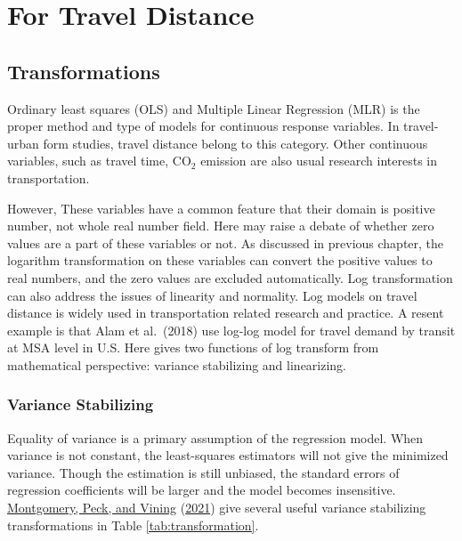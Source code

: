 \documentclass[
  11pt,
  openany]{memoir}
\begin{document}
\hypertarget{for-travel-distance}{%
\section{For Travel Distance}\label{for-travel-distance}}

\hypertarget{transformations}{%
\subsection{Transformations}\label{transformations}}

Ordinary least squares (OLS) and Multiple Linear Regression (MLR) is the proper method and type of models for continuous response variables. In travel-urban form studies, travel distance belong to this category. Other continuous variables, such as travel time, CO\(_2\) emission are also usual research interests in transportation.

However, These variables have a common feature that their domain is positive number, not whole real number field. Here may raise a debate of whether zero values are a part of these variables or not.
As discussed in previous chapter, the logarithm transformation on these variables can convert the positive values to real numbers, and the zero values are excluded automatically.
Log transformation can also address the issues of linearity and normality.
Log models on travel distance is widely used in transportation related research and practice. A resent example is that Alam et al.~(2018) use log-log model for travel demand by transit at MSA level in U.S.
Here gives two functions of log transform from mathematical perspective: variance stabilizing and linearizing.

\hypertarget{variance-stabilizing}{%
\subsubsection{Variance Stabilizing}\label{variance-stabilizing}}

Equality of variance is a primary assumption of the regression model.
When variance is not constant, the least-squares estimators will not give the minimized variance.
Though the estimation is still unbiased, the standard errors of regression coefficients will be larger and the model becomes insensitive.
\protect\hyperlink{ref-montgomeryIntroductionLinearRegression2021}{Montgomery, Peck, and Vining} (\protect\hyperlink{ref-montgomeryIntroductionLinearRegression2021}{2021}) give several useful variance stabilizing transformations in Table \ref{tab:transformation}.
\end{document}
